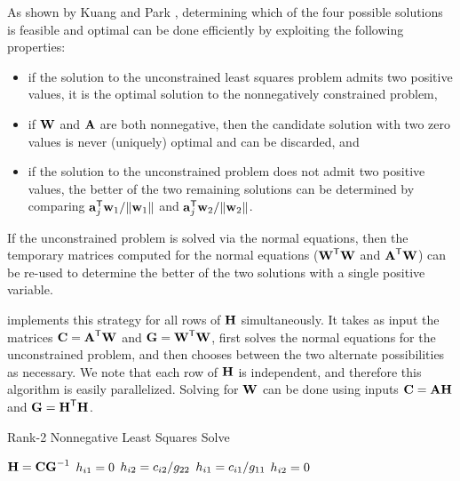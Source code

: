 \documentclass[conference,compsoc]{IEEEtran}
\begin{document}
As shown by Kuang and Park \cite{KP13}, determining which of the four possible solutions is feasible and optimal can be done efficiently by exploiting the following properties:
\begin{itemize}
	\item if the solution to the unconstrained least squares problem admits two positive values, it is the optimal solution to the nonnegatively constrained problem,
	\item if $\M{W}$ and $\M{A}$ are both nonnegative, then the candidate solution with two zero values is never (uniquely) optimal and can be discarded, and
	\item if the solution to the unconstrained problem does not admit two positive values, the better of the two remaining solutions can be determined by comparing $\V{a}_{j}^\Tra\V{w}_1 / \|\V{w}_1\|$ and $\V{a}_{j}^\Tra\V{w}_2 / \|\V{w}_2\|$.
\end{itemize}
If the unconstrained problem is solved via the normal equations, then the temporary matrices computed for the normal equations ($\M{W}^\Tra\M{W}$ and $\M{A}^\Tra\M{W}$) can be re-used to determine the better of the two solutions with a single positive variable.

 implements this strategy for all rows of $\M{H}$ simultaneously.
It takes as input the matrices $\M{C}=\M{A}^\Tra\M{W}$ and $\M{G}=\M{W}^\Tra\M{W}$, first solves the normal equations for the unconstrained problem, and then chooses between the two alternate possibilities as necessary.
We note that each row of $\M{H}$ is independent, and therefore this algorithm is easily parallelized.
Solving for $\M{W}$ can be done using inputs $\M{C}=\M{A}\M{H}$ and $\M{G}=\M{H}^\Tra\M{H}$.

\begin{algorithm}
\caption{Rank-2 Nonnegative Least Squares Solve \cite{KP13}}
\label{alg:r2nnls}
\begin{algorithmic}[1]
		\State $\M{H} = \M{C}\M{G}^{-1}$ \hfill {}
				\State {}
					\State $\ME{H}{i1} = 0$
					\State $\ME{H}{i2} = \ME{C}{i2} / \ME{G}{22}$
				\Else
					\State $\ME{H}{i1} = \ME{C}{i1} / \ME{G}{11}$
					\State $\ME{H}{i2} = 0$
				\EndIf
			\EndIf
		\EndFor
	\EndFunction
\end{algorithmic}
\end{algorithm}
\end{document}

